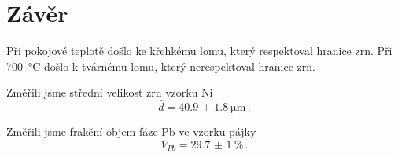 \section*{Závěr}
Při pokojové teplotě došlo ke křehkému lomu, který respektoval hranice zrn. Při \SI{700}{\degreeCelsius} došlo k tvárnému lomu, který nerespektoval hranice zrn.

Změřili jsme střední velikost zrn vzorku Ni
\begin{equation*}
\bar{d}=\SI{40.9(18)}{\um} \,.
\end{equation*}

Změřili jsme frakční objem fáze Pb ve vzorku pájky
\begin{equation*}
V_{Pb} =\SI{29.7(10)}{\percent} \,.
\end{equation*}
